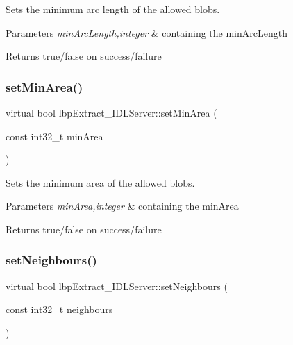 Sets the minimum arc length of the allowed blobs. 


\begin{DoxyParams}{Parameters}
{\em min\+Arc\+Length,integer} & containing the min\+Arc\+Length \\
\hline
\end{DoxyParams}
\begin{DoxyReturn}{Returns}
true/false on success/failure 
\end{DoxyReturn}
\mbox{\label{classlbpExtract__IDLServer_a13eb918e54b2eee6fe2811fbe8f6aee6}} 
\subsubsection{\texorpdfstring{set\+Min\+Area()}{setMinArea()}}
{\footnotesize\ttfamily virtual bool lbp\+Extract\+\_\+\+I\+D\+L\+Server\+::set\+Min\+Area (\begin{DoxyParamCaption}\item[{const int32\+\_\+t}]{min\+Area }\end{DoxyParamCaption})\hspace{0.3cm}{\ttfamily [virtual]}}



Sets the minimum area of the allowed blobs. 


\begin{DoxyParams}{Parameters}
{\em min\+Area,integer} & containing the min\+Area \\
\hline
\end{DoxyParams}
\begin{DoxyReturn}{Returns}
true/false on success/failure 
\end{DoxyReturn}
\mbox{\label{classlbpExtract__IDLServer_aa72b58e41cf97d26825515cc9d5e6aa6}} 
\subsubsection{\texorpdfstring{set\+Neighbours()}{setNeighbours()}}
{\footnotesize\ttfamily virtual bool lbp\+Extract\+\_\+\+I\+D\+L\+Server\+::set\+Neighbours (\begin{DoxyParamCaption}\item[{const int32\+\_\+t}]{neighbours }\end{DoxyParamCaption})\hspace{0.3cm}{\ttfamily [virtual]}}




